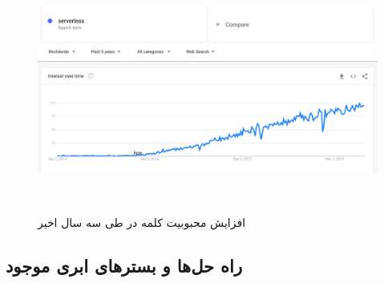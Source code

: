 \begin{figure}[!h]
	\centering
	\includegraphics[height=8cm]{images/serverless_google_trends}
	\caption{افزایش محبوبیت کلمه  ‌‌در  طی سه سال اخیر}
	\label{تصویر 2-1}
\end{figure}

\subsection{راه حل‌ها و بسترهای ابری موجود}

